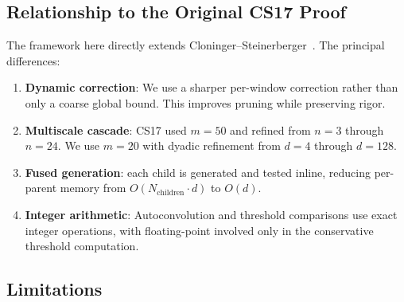 \documentclass[11pt, letterpaper]{article}
\theoremstyle{paperplain}
\theoremstyle{paperdef}
\begin{document}
\subsection{Relationship to the Original CS17 Proof}

The framework here directly extends
Cloninger--Steinerberger~\cite{CS17}.  The principal differences:

\begin{enumerate}
  \item \textbf{Dynamic correction}: We use a sharper per-window
    correction rather than only a coarse global bound.  This improves
    pruning while preserving rigor.

  \item \textbf{Multiscale cascade}: CS17 used $m = 50$ and refined
    from $n = 3$ through $n = 24$.  We use $m = 20$ with dyadic
    refinement from $d = 4$ through $d = 128$.

  \item \textbf{Fused generation}: each child is generated and tested
    inline, reducing per-parent memory from
    $O(N_{\mathrm{children}} \cdot d)$ to $O(d)$.

  \item \textbf{Integer arithmetic}: Autoconvolution and threshold
    comparisons use exact integer operations, with floating-point
    involved only in the conservative threshold computation.
\end{enumerate}

\subsection{Limitations}
\end{document}
